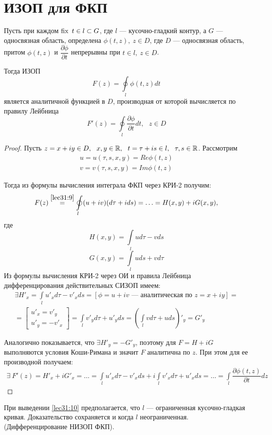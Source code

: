 \documentclass[../../main.tex]{subfiles}
\begin{document}
\section{ИЗОП для ФКП}
\begin{thm}
    Пусть при каждом $\operatorname{fix} \ t \in l \subset G$, где $l$ --- кусочно-гладкий
    контур, а $G$ --- односвязная область, определена $ \phi(t, z), \
    z \in D $, где $D$ --- односвязная область, притом
    $\phi(t, z)$ и $\dfrac{\partial \phi}{\partial t}$ непрерывны при
    $t \in l, \ z \in D$.
    
    Тогда ИЗОП
    \begin{equation}
        \label{lec31:9}
        F(z) = \oint\limits_{l} \phi(t, z) dt
    \end{equation}
    является аналитичной функцией в $D$, производная от которой вычисляется
    по правилу Лейбница
    \begin{equation}
        \label{lec31:10}
        F'(z) = \oint\limits_{l} \dfrac{\partial \phi}{\partial t} dt,
        \ \ \ z \in D
    \end{equation}
\end{thm}
\begin{proof}
    Пусть $z = x + i y \in D, \ \ x, y \in \R, \ \ t = \tau + i s \in l,
    \ \ \tau, s \in \R$. Рассмотрим \[ \begin{gathered}
    u = u(\tau, s, x, y) = Re \phi(t, z) \\
    v = v(\tau, s, x, y) = Im \phi(t, z)
    \end{gathered} \]

    Тогда из формулы вычисления интеграла ФКП через КРИ-2 получим:
    \[ F(z) \stackrel{\eqref{lec31:9}}{=} \oint\limits_{l} (u + i v)
    (d \tau + i d s) = \ldots = H(x, y) + i G(x, y),\]
    где
    \[ H(x, y) = \int\limits_{l} u d \tau - v d s \]
    \[ G(x, y) = \int\limits_{l} u d s + v d \tau \]
    Из формулы вычисления КРИ-2 через ОИ и правила Лейбница
    дифференцирования действительных СИЗОП имеем:
    \[ \begin{gathered} 
        \exists H'_x = \int\limits_{l} u'_x d \tau - v'_x d s =
        [ \phi = u + i v \text{ \ --- аналитическая по \ } z = x + i y ]
        = \\ =
        \left[\begin{gathered}
            u'_x = v'_y \\
            u'_y = - v'_x
        \end{gathered}\right] =
        \int\limits_{l} v'_y d \tau + u'_y d s =
        \left(\int\limits_{l} v d \tau + u d s\right)'_y = G'_y
    \end{gathered} \]

    Аналогично показывается, что $\exists H'_y = -G'_y$, поэтому для
    $ F = H + i G $
    выполняются условия Коши-Римана и значит $F$ аналитична по $z$.
    При этом для ее производной получаем:
    \[\begin{gathered}
        \exists \ F'(z) = H'_x + i G'_x = \ldots =
        \int\limits_{l} u'_x d \tau - v'_x d s + 
        i \int\limits_{l} v'_x d \tau + u'_x d s = \ldots =
        \int\limits_{l} \dfrac{\partial \phi (t, z)}{\partial t} d z
    \end{gathered}\] 
\end{proof}
\begin{rem}
    При выведении \eqref{lec31:10} предполагается, что $l$ ---
    ограниченная кусочно-гладкая кривая. Доказательство сохраняется
    и когда $l$ неограниченная. (Дифференцирование НИЗОП ФКП).
\end{rem}
\end{document}
